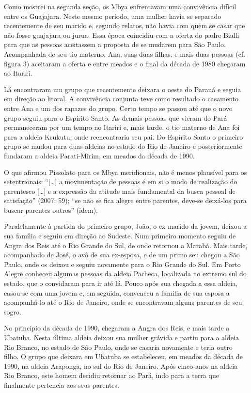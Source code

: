 {{Como mostrei na segunda seção, os Mbya enfrentavam uma convivência
difícil entre os Guajajara. Neste mesmo período, uma mulher havia se
separado recentemente de seu marido e, segundo relatos, não havia com
quem se casar que não fosse guajajara ou jurua. Essa época coincidiu
com a oferta do padre Bialli para que as pessoas aceitassem a proposta
de se mudarem para São Paulo. Acompanhada de seu tio materno, Ana, suas
duas filhas, e mais duas pessoas (cf. figura 3) aceitaram a oferta e
entre meados e o final da década de 1980 chegaram ao Itariri.

Lá encontraram um grupo que recentemente deixara o oeste do Paraná e
seguia em direção ao litoral. A convivência conjunta teve como
resultado o casamento entre Ana e um dos rapazes do grupo. Certo tempo
se passou até que o novo grupo seguiu para o Espírito Santo. As demais
pessoas que vieram do Pará permaneceram por um tempo no Itariri e, mais
tarde, o tio materno de Ana foi para a aldeia Krukutu, onde
reencontraria seu pai. Do Espírito Santo o primeiro grupo se mudou para
duas aldeias no estado do Rio de Janeiro e posteriormente fundaram a
aldeia Parati-Mirim, em meados da década de 1990.

O que afirmou Pissolato para os Mbya meridionais, não é menos plausível
para os setentrionais: ``[\ldots{}] a movimentação de pessoas é em si o modo
de realização do parentesco [\ldots{}] e a expressão da atitude mais
fundamental da busca pessoal de satisfação'' (2007: 59); ``se não se fica
alegre entre parentes, deve-se deixá-los para buscar parentes outros''
(idem).

Paralelamente à partida do primeiro grupo, João, o ex-marido da jovem,
deixou a sua família e seguiu em direção ao Sudeste. Num primeiro
momento seguiu de Angra dos Reis até o Rio Grande do Sul, de onde
retornou a Marabá. Mais tarde, acompanhado de José, o avô de sua
ex-esposa, e de um primo seu chegou a São Paulo, onde os deixou e
seguiu novamente para o Rio Grande do Sul. Em Porto Alegre conheceu
algumas pessoas da aldeia Pacheca, localizada no extremo sul do estado,
que o convidaram para ir até lá. Pouco após sua chegada a essa aldeia,
casou-se com uma jovem e, em seguida, convenceu a família de sua esposa
a acompanhá-lo até o Rio de Janeiro, onde se encontravam alguns
parentes de seu sogro.

No princípio da década de 1990, chegaram a Angra dos Reis, e mais tarde
a Ubatuba. Nesta última aldeia deixou sua mulher grávida e partiu para
a aldeia Rio Branco, no estado de São Paulo, onde se casaria novamente
e teria outro filho. O grupo que deixara em Ubatuba se estabeleceu, em
meados da década de 1990, na aldeia Araponga, no sul do Rio de Janeiro.
Após cinco anos na aldeia Rio Branco, este homem decidiu retornar ao
Pará, indo para a terra que finalmente pertencia aos seus parentes.

}}
